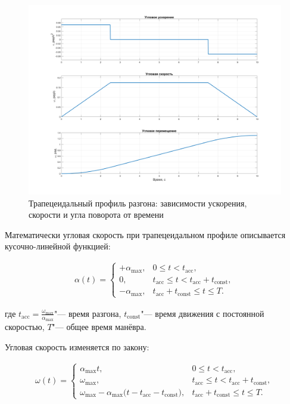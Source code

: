 \begin{figure}[h!]
	\centering
	\includegraphics[scale=0.3]{matlab/img/line_profile.png}
	\caption{Трапецеидальный профиль разгона: зависимости ускорения, скорости и угла поворота от времени}
	\label{fig:line-profile}
\end{figure}


Математически угловая скорость при трапецеидальном профиле описывается кусочно-линейной функцией:

\begin{equation}
	\begin{split}
		\label{eq:trap_alpha}
		\alpha(t) = 
		\begin{cases}
			+\alpha_{\max}, & 0 \leq t < t_{\mathrm{acc}},\\[6pt]
			0, & t_{\mathrm{acc}} \leq t < t_{\mathrm{acc}} + t_{\mathrm{const}},\\[6pt]
			-\alpha_{\max}, & t_{\mathrm{acc}} + t_{\mathrm{const}} \leq t \leq T.
		\end{cases}
	\end{split}
\end{equation}

где \(t_{\mathrm{acc}}=\frac{\omega_{\mathrm{max}}}{\alpha_{\max}}\)"--- время разгона, \(t_{\mathrm{const}}\)"--- время движения с постоянной скоростью, \(T\)"--- общее время манёвра.

Угловая скорость изменяется по закону:

\begin{equation}
	\begin{split}
		\label{eq:trap_omega}
		\omega(t) =
		\begin{cases}
			\alpha_{\max} t, & 0 \leq t < t_{\mathrm{acc}},\\[6pt]
			\omega_{\max}, & t_{\mathrm{acc}} \leq t < t_{\mathrm{acc}} + t_{\mathrm{const}},\\[6pt]
			\omega_{\max} - \alpha_{\max}\!\bigl(t - t_{\mathrm{acc}} - t_{\mathrm{const}}\bigr), 
			& t_{\mathrm{acc}} + t_{\mathrm{const}} \leq t \leq T.
		\end{cases}
	\end{split}
\end{equation}



